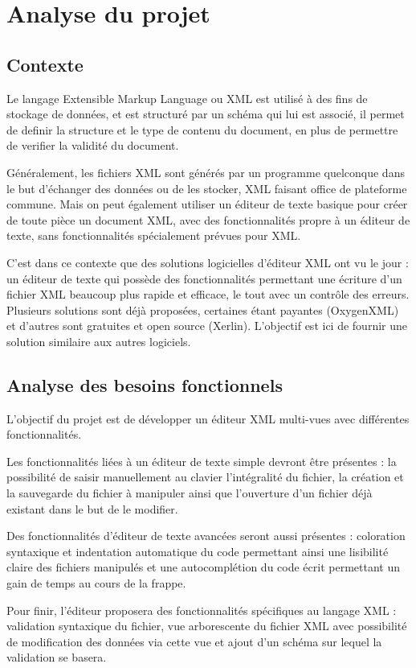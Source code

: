 \chapter{Analyse du projet}
	\section{Contexte}
	Le langage Extensible Markup Language ou XML est utilisé à des fins de stockage de données, et est structuré par un schéma qui lui est associé, il permet de definir la structure et le type de contenu du document, en plus de permettre de verifier la validité du document.

	Généralement, les fichiers XML sont générés par un programme quelconque dans le but d'échanger des données ou de les stocker, XML faisant office de plateforme commune. Mais on peut également utiliser un éditeur de texte basique pour créer de toute pièce un document XML, avec des fonctionnalités propre à un éditeur de texte, sans fonctionnalités spécialement prévues pour XML.
	
	C'est dans ce contexte que des solutions logicielles d'éditeur XML ont vu le jour : un éditeur de texte qui possède des fonctionnalités permettant une écriture d'un fichier XML beaucoup plus rapide et efficace, le tout avec un contrôle des erreurs. Plusieurs solutions sont déjà proposées, certaines étant payantes (OxygenXML) et d'autres sont gratuites et open source (Xerlin). L'objectif est ici de fournir une solution similaire aux autres logiciels.
	
	\section{Analyse des besoins fonctionnels}
	L'objectif du projet est de développer un éditeur XML multi-vues avec différentes fonctionnalités.
	
	Les fonctionnalités liées à un éditeur de texte simple devront être présentes : la possibilité de saisir manuellement au clavier l'intégralité du fichier, la création et la sauvegarde du fichier à manipuler ainsi que l'ouverture d'un fichier déjà existant dans le but de le modifier.
	
	Des fonctionnalités d'éditeur de texte avancées seront aussi présentes : coloration syntaxique et indentation automatique du code permettant ainsi une lisibilité claire des fichiers manipulés et une autocomplétion du code écrit permettant un gain de temps au cours de la frappe.

	Pour finir, l'éditeur proposera des fonctionnalités spécifiques au langage XML : validation syntaxique du fichier, vue arborescente du fichier XML avec possibilité de modification des données via cette vue et ajout d'un schéma sur lequel la validation se basera.
	
